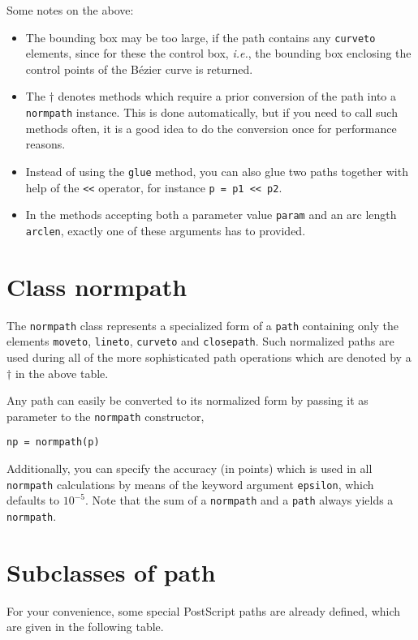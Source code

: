 Some notes on the above:
\begin{itemize}
\item The bounding box may be too large, if the path contains any
  \texttt{curveto} elements, since for these the control box,
  \textit{i.e.}, the bounding box enclosing the control points of
  the B\'ezier curve is returned.
\item The $\dagger$ denotes methods which require a prior
  conversion of the path into a \verb|normpath| instance. This is
  done automatically, but if you need to call such methods often,
  it is a good idea to do the conversion once for performance reasons.
\item Instead of using the \verb|glue| method, you can also glue two
paths together with help of the \verb|<<| operator, for instance
\verb|p = p1 << p2|.
\item In the methods accepting both a parameter value \verb|param| and
  an arc length \verb|arclen|, exactly one of these arguments has to
  provided.
\end{itemize}

\section{Class normpath}

The \texttt{normpath} class represents a specialized form of a
\texttt{path} containing only the elements \verb|moveto|,
\verb|lineto|, \verb|curveto| and \verb|closepath|. Such normalized
paths are used during all of the more sophisticated path operations
which are denoted by a $\dagger$ in the above table.


Any path can easily be converted to its normalized form by passing it
as parameter to the \texttt{normpath} constructor,
\begin{verbatim}
np = normpath(p)
\end{verbatim}
Additionally, you can specify the accuracy (in points) which is used
in all \verb|normpath| calculations by means of the keyword argument
\verb|epsilon|, which defaults to $10^{-5}$.  Note that the sum of a
\verb|normpath| and a \verb|path| always yields a \verb|normpath|.

\section{Subclasses of path}

For your convenience, some special PostScript paths are already defined, which
are given in the following table.

